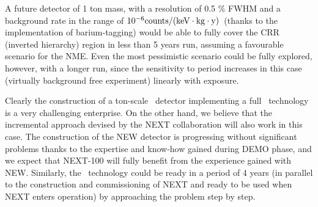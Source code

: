 A future detector of 1 ton mass, with a resolution of 0.5 \% FWHM and a background rate in the range of $10^{-6} \rm counts/(keV \cdot kg \cdot y)$~(thanks to the implementation of barium-tagging) would be able to fully cover the CRR (inverted hierarchy) region in less than 5 years run, assuming a favourable scenario for the NME. Even the most pessimistic scenario could be fully explored, however, with a longer run, since the sensitivity to period increases in this case (virtually background free experiment) linearly with exposure. 

Clearly the construction of a ton-scale \HPXE\ detector implementing a full \BATA\ technology is a very challenging enterprise. On the other hand, we believe that the incremental approach devised by the NEXT collaboration will also work in this case. The construction of the NEW detector is progressing without significant problems thanks to the expertise and know-how gained during DEMO phase, and we expect that NEXT-100 will fully benefit from the experience gained with NEW. Similarly, the \BATA\ technology could be ready in a period of 4 years (in parallel to the construction and commissioning of NEXT and ready to be used when NEXT enters operation) by approaching the problem step by step. 

